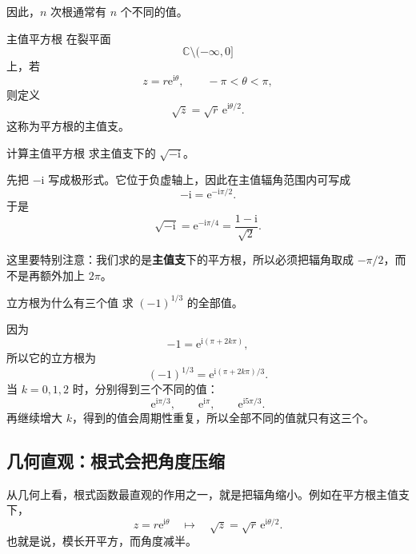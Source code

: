 因此，$n$ 次根通常有 $n$ 个不同的值。

\begin{dingliyi}{主值平方根}{}
在裂平面
\[
    \mathbb{C}\setminus(-\infty,0]
\]
上，若
\[
    z=r\mathrm{e}^{\mathrm{i}\theta},\qquad -\pi<\theta<\pi,
\]
则定义
\[
    \sqrt{z}=\sqrt{r}\,\mathrm{e}^{\mathrm{i}\theta/2}.
\]
这称为平方根的主值支。
\end{dingliyi}

\begin{lizi}{计算主值平方根}{}
求主值支下的 $\sqrt{-\mathrm{i}}$。

\begin{jie}
先把 $-\mathrm{i}$ 写成极形式。它位于负虚轴上，因此在主值辐角范围内可写成
\[
    -\mathrm{i}=\mathrm{e}^{-\mathrm{i}\pi/2}.
\]
于是
\[
    \sqrt{-\mathrm{i}}
    =\mathrm{e}^{-\mathrm{i}\pi/4}
    =\frac{1-\mathrm{i}}{\sqrt{2}}.
\]

这里要特别注意：我们求的是\textbf{主值支}下的平方根，所以必须把辐角取成 $-\pi/2$，而不是再额外加上 $2\pi$。
\end{jie}
\end{lizi}

\begin{lizi}{立方根为什么有三个值}{}
求 $(-1)^{1/3}$ 的全部值。

\begin{jie}
因为
\[
    -1=\mathrm{e}^{\mathrm{i}(\pi+2k\pi)},
\]
所以它的立方根为
\[
    (-1)^{1/3}
    =
    \mathrm{e}^{\mathrm{i}(\pi+2k\pi)/3}.
\]
当 $k=0,1,2$ 时，分别得到三个不同的值：
\[
    \mathrm{e}^{\mathrm{i}\pi/3},\qquad
    \mathrm{e}^{\mathrm{i}\pi},\qquad
    \mathrm{e}^{\mathrm{i}5\pi/3}.
\]
再继续增大 $k$，得到的值会周期性重复，所以全部不同的值就只有这三个。
\end{jie}
\end{lizi}

\subsection{几何直观：根式会把角度压缩}

从几何上看，根式函数最直观的作用之一，就是把辐角缩小。例如在平方根主值支下，
\[
    z=r\mathrm{e}^{\mathrm{i}\theta}
    \quad\longmapsto\quad
    \sqrt{z}=\sqrt{r}\,\mathrm{e}^{\mathrm{i}\theta/2}.
\]
也就是说，模长开平方，而角度减半。

